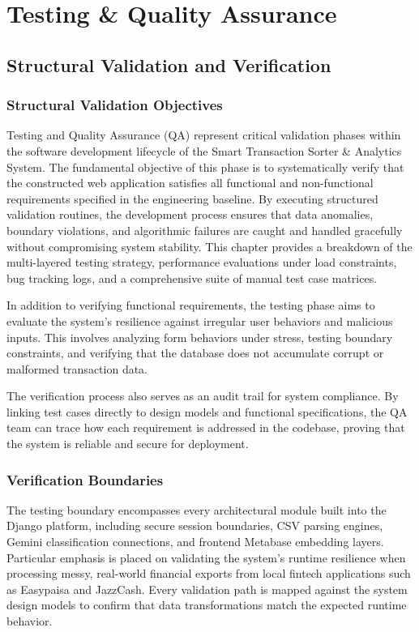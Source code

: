 \chapter{Testing \& Quality Assurance}

\section{Structural Validation and Verification}
\subsection{Structural Validation Objectives}
Testing and Quality Assurance (QA) represent critical validation phases within the software development lifecycle of the Smart Transaction Sorter \& Analytics System. The fundamental objective of this phase is to systematically verify that the constructed web application satisfies all functional and non-functional requirements specified in the engineering baseline. By executing structured validation routines, the development process ensures that data anomalies, boundary violations, and algorithmic failures are caught and handled gracefully without compromising system stability. This chapter provides a breakdown of the multi-layered testing strategy, performance evaluations under load constraints, bug tracking logs, and a comprehensive suite of manual test case matrices.

In addition to verifying functional requirements, the testing phase aims to evaluate the system's resilience against irregular user behaviors and malicious inputs. This involves analyzing form behaviors under stress, testing boundary constraints, and verifying that the database does not accumulate corrupt or malformed transaction data.

The verification process also serves as an audit trail for system compliance. By linking test cases directly to design models and functional specifications, the QA team can trace how each requirement is addressed in the codebase, proving that the system is reliable and secure for deployment.

\subsection{Verification Boundaries}
The testing boundary encompasses every architectural module built into the Django platform, including secure session boundaries, CSV parsing engines, Gemini classification connections, and frontend Metabase embedding layers. Particular emphasis is placed on validating the system's runtime resilience when processing messy, real-world financial exports from local fintech applications such as Easypaisa and JazzCash. Every validation path is mapped against the system design models to confirm that data transformations match the expected runtime behavior.

